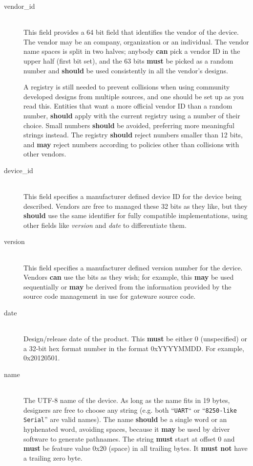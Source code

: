 \documentclass[a4paper, 12pt]{article}
\begin{document}
\begin{description}
\item[vendor\_id] \hfill \\
This field provides a 64 bit field that identifies the vendor of the device. The vendor may
be an company, organization or an individual. The vendor name spaces is split in two halves;
anybody \textbf{can} pick a vendor ID in the upper half (first bit set), and the
63 bits \textbf{must} be picked as a random number and \textbf{should} be used consistently
in all the vendor's designs.

A registry is still needed to prevent collisions when using community developed designs from
multiple sources, and one should be set up as you read this.
Entities that want a more official vendor
ID than a random number, \textbf{should} apply with the current registry using a number of their choice.
Small
numbers \textbf{should} be avoided, preferring more meaningful strings instead. The
registry \textbf{should} reject numbers smaller than 12 bits, and \textbf{may} reject numbers
according to policies other than collisions with other vendors.

\item[device\_id] \hfill \\
This field specifies a manufacturer defined device ID for the device being described.
Vendors are free to managed these 32 bits as they like, but they \textbf{should} use
the same identifier for fully compatible implementations, using other fields like \textit{version}
and \textit{date} to differentiate them.

\item[version] \hfill \\
This field specifies a manufacturer defined version number for the device. Vendors
\textbf{can} use the bits as they wish; for example, this \textbf{may} be used sequentially
or \textbf{may} be derived from the information provided by the source code management in use
for gateware source code.


\item[date] \hfill \\
Design/release date of the product. This \textbf{must} be either 0 (unspecified) or a 32-bit hex
format number in the format 0xYYYYMMDD. For example, 0x20120501.

\item[name] \hfill \\
The UTF-8 name of the device. As long as the name fits in 19 bytes, designers are free to choose
any string (e.g. both ``\texttt{UART}`` or ``\texttt{8250-like Serial}'' are valid names).
The name \textbf{should} be a single word or an hyphenated word, avoiding spaces, because it \textbf{may}
be used by driver software to generate pathnames.  The string \textbf{must} start at offset 0
and \textbf{must} be feature value 0x20 (space) in all trailing bytes.
It \textbf{must not} have a trailing zero byte.


\end{description}
\end{document}
